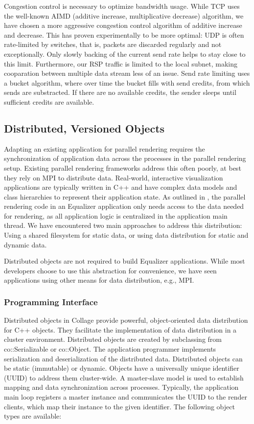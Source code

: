 \documentclass[10pt,journal,compsoc]{IEEEtran}
\begin{document}
Congestion control is necessary to optimize bandwidth usage. While TCP uses the
well-known AIMD (additive increase, multiplicative decrease) algorithm, we have
chosen a more aggressive congestion control algorithm of additive increase and
decrease. This has proven experimentally to be more optimal: UDP is often
rate-limited by switches, that is, packets are discarded regularly and not
exceptionally. Only slowly backing of the current send rate helps to stay close
to this limit. Furthermore, our RSP traffic is limited to the local subnet,
making cooparation between multiple data stream less of an issue. Send rate
limiting uses a bucket algorithm, where over time the bucket fills with send
credits, from which sends are substracted. If there are no available credits,
the sender sleeps until sufficient credits are available.

\subsection{Distributed, Versioned Objects}

Adapting an existing application for parallel rendering requires the
synchronization of application data across the processes in the parallel
rendering setup. Existing parallel rendering frameworks address this often
poorly, at best they rely on MPI to distribute data. Real-world, interactive
visualization applications are typically written in C++ and have complex data
models and class hierarchies to represent their application state. As outlined
in \cite{EMP:09}, the parallel rendering code in an Equalizer application only
needs access to the data needed for rendering, as all application logic is
centralized in the application main thread. We have encountered two main
approaches to address this distribution: Using a shared filesystem for static
data, or using data distribution for static and dynamic data.

Distributed objects are not required to build Equalizer applications. While most
developers choose to use this abstraction for convenience, we have seen
applications using other means for data distribution, e.g., MPI.

\subsubsection{Programming Interface}

Distributed objects in Collage provide powerful, object-oriented data
distribution for C++ objects. They facilitate the implementation of data
distribution in a cluster environment. Distributed objects are created by
subclassing from \textsf{co::Serializable} or \textsf{co::Object}. The
application programmer implements serialization and deserialization of the
distributed data. Distributed objects can be static (immutable) or
dynamic. Objects have a universally unique identifier (UUID) to address them
cluster-wide. A master-slave model is used to establish mapping and data
synchronization across processes. Typically, the application main loop registers
a master instance and communicates the UUID to the render clients, which map
their instance to the given identifier. The following object types are
available:
\end{document}
